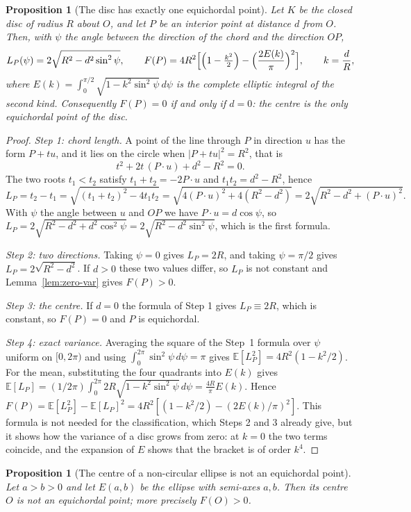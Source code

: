\documentclass[11pt]{article}
\newcommand{\EE}{\mathbb{E}}
\newtheorem{proposition}[theorem]{Proposition}
\theoremstyle{definition}
\theoremstyle{remark}
\begin{document}
\begin{proposition}[The disc has exactly one equichordal point]\label{prop:disc}
Let $K$ be the closed disc of radius $R$ about $O$, and let $P$ be an interior point at distance $d$ from $O$.
Then, with $\psi$ the angle between the direction of the chord and the direction $OP$,
\[
L_P(\psi)=2\sqrt{R^2-d^2\sin^2\psi},\qquad
F(P)=4R^2\Bigl[\Bigl(1-\tfrac{k^2}{2}\Bigr)-\Bigl(\frac{2E(k)}{\pi}\Bigr)^{2}\Bigr],\qquad k=\frac{d}{R},
\]
where $E(k)=\int_0^{\pi/2}\sqrt{1-k^2\sin^2\psi}\,d\psi$ is the complete elliptic integral of the second kind.
Consequently $F(P)=0$ if and only if $d=0$: the centre is the only equichordal point of the disc.
\end{proposition}

\begin{proof}
\emph{Step 1: chord length.} A point of the line through $P$ in direction $u$ has the form $P+tu$, and it lies on
the circle when $|P+tu|^2=R^2$, that is
\[
t^2+2t\,(P\cdot u)+d^2-R^2=0 .
\]
The two roots $t_1<t_2$ satisfy $t_1+t_2=-2P\cdot u$ and $t_1t_2=d^2-R^2$, hence
\[
L_P=t_2-t_1=\sqrt{(t_1+t_2)^2-4t_1t_2}=\sqrt{4(P\cdot u)^2+4(R^2-d^2)}=2\sqrt{R^2-d^2+(P\cdot u)^2} .
\]
With $\psi$ the angle between $u$ and $OP$ we have $P\cdot u=d\cos\psi$, so
$L_P=2\sqrt{R^2-d^2+d^2\cos^2\psi}=2\sqrt{R^2-d^2\sin^2\psi}$, which is the first formula.

\emph{Step 2: two directions.} Taking $\psi=0$ gives $L_P=2R$, and taking $\psi=\pi/2$ gives
$L_P=2\sqrt{R^2-d^2}$. If $d>0$ these two values differ, so $L_P$ is not constant and
Lemma~\ref{lem:zero-var} gives $F(P)>0$.

\emph{Step 3: the centre.} If $d=0$ the formula of Step 1 gives $L_P\equiv 2R$, which is constant, so $F(P)=0$ and
$P$ is equichordal.

\emph{Step 4: exact variance.} Averaging the square of the Step~1 formula over $\psi$ uniform on $[0,2\pi)$ and using
$\int_0^{2\pi}\sin^2\psi\,d\psi=\pi$ gives $\EE[L_P^2]=4R^2(1-k^2/2)$. For the mean, substituting the four
quadrants into $E(k)$ gives $\EE[L_P]=(1/2\pi)\int_0^{2\pi}2R\sqrt{1-k^2\sin^2\psi}\,d\psi=\frac{4R}{\pi}E(k)$.
Hence $F(P)=\EE[L_P^2]-\EE[L_P]^2=4R^2[(1-k^2/2)-(2E(k)/\pi)^2]$. This formula is not needed for the
classification, which Steps 2 and 3 already give, but it shows how the variance of a disc grows from zero: at
$k=0$ the two terms coincide, and the expansion of $E$ shows that the bracket is of order $k^4$.
\end{proof}

\begin{proposition}[The centre of a non-circular ellipse is not an equichordal point]\label{prop:ellipse-centre}
Let $a>b>0$ and let $E(a,b)$ be the ellipse with semi-axes $a,b$. Then its centre $O$ is not an equichordal point;
more precisely $F(O)>0$.
\end{proposition}
\end{document}
